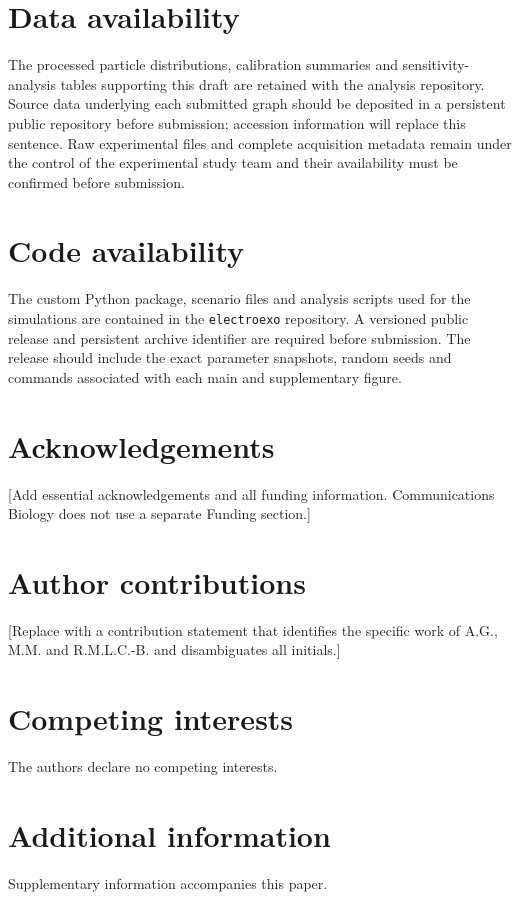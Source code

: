 \section*{Data availability}

The processed particle distributions, calibration summaries and sensitivity-analysis tables supporting this draft are retained with the analysis repository. Source data underlying each submitted graph should be deposited in a persistent public repository before submission; accession information will replace this sentence. Raw experimental files and complete acquisition metadata remain under the control of the experimental study team and their availability must be confirmed before submission.

\section*{Code availability}

The custom Python package, scenario files and analysis scripts used for the simulations are contained in the \texttt{electroexo} repository. A versioned public release and persistent archive identifier are required before submission. The release should include the exact parameter snapshots, random seeds and commands associated with each main and supplementary figure.

\section*{Acknowledgements}

[Add essential acknowledgements and all funding information. Communications Biology does not use a separate Funding section.]

\section*{Author contributions}

[Replace with a contribution statement that identifies the specific work of A.G., M.M. and R.M.L.C.-B. and disambiguates all initials.]

\section*{Competing interests}

The authors declare no competing interests.

\section*{Additional information}

Supplementary information accompanies this paper.
